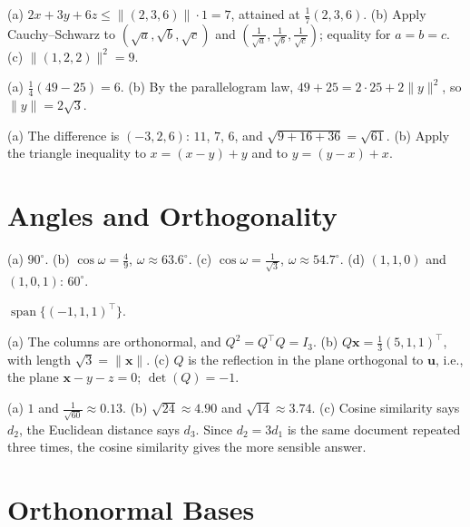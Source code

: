 \documentclass[11pt]{article}
\newcommand{\norm}[1]{\lVert #1 \rVert}
\DeclareMathOperator{\Span}{span}
\begin{document}
\begin{description}[leftmargin=0pt, itemsep=0.3em]
    \item[\ref{pr:cs-apps}.] (a) $2x + 3y + 6z \leq \norm{(2, 3, 6)} \cdot 1 = 7$, attained at $\frac{1}{7}(2, 3, 6)$. (b) Apply Cauchy--Schwarz to $(\sqrt{a}, \sqrt{b}, \sqrt{c})$ and $(\frac{1}{\sqrt{a}}, \frac{1}{\sqrt{b}}, \frac{1}{\sqrt{c}})$; equality for $a = b = c$. (c) $\norm{(1, 2, 2)}^2 = 9$.
    \item[\ref{pr:polarization}.] (a) $\frac{1}{4}(49 - 25) = 6$. (b) By the parallelogram law, $49 + 25 = 2 \cdot 25 + 2\norm{y}^2$, so $\norm{y} = 2\sqrt{3}$.
    \item[\ref{pr:dist}.] (a) The difference is $(-3, 2, 6)$: $11$, $7$, $6$, and $\sqrt{9 + 16 + 36} = \sqrt{61}$. (b) Apply the triangle inequality to $x = (x - y) + y$ and to $y = (y - x) + x$.
\end{description}

\section*{Angles and Orthogonality}

\begin{description}[leftmargin=0pt, itemsep=0.3em]
    \item[\ref{pr:angles}.] (a) $90^\circ$. (b) $\cos\omega = \frac{4}{9}$, $\omega \approx 63.6^\circ$. (c) $\cos\omega = \frac{1}{\sqrt{3}}$, $\omega \approx 54.7^\circ$. (d) $(1, 1, 0)$ and $(1, 0, 1)$: $60^\circ$.
    \item[\ref{pr:orth-to-two}.] $\Span\{(-1, 1, 1)^\top\}$.
    \item[\ref{pr:householder-q}.] (a) The columns are orthonormal, and $Q^2 = Q^\top Q = I_3$. (b) $Q\mathbf{x} = \frac{1}{3}(5, 1, 1)^\top$, with length $\sqrt{3} = \norm{\mathbf{x}}$. (c) $Q$ is the reflection in the plane orthogonal to $\mathbf{u}$, i.e., the plane $\mathbf{x} - y - z = 0$; $\det(Q) = -1$.
    \item[\ref{pr:cosine-docs}.] (a) $1$ and $\frac{1}{\sqrt{60}} \approx 0.13$. (b) $\sqrt{24} \approx 4.90$ and $\sqrt{14} \approx 3.74$. (c) Cosine similarity says $d_2$, the Euclidean distance says $d_3$. Since $d_2 = 3d_1$ is the same document repeated three times, the cosine similarity gives the more sensible answer.
\end{description}

\section*{Orthonormal Bases}
\end{document}

